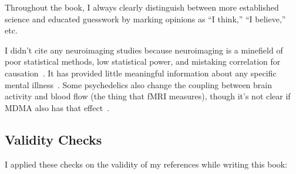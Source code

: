 \documentclass[11pt,oneside]{book}
\let\cite\parencite
\begin{document}
Throughout the book, I always clearly distinguish between more established science and educated guesswork by marking opinions as \enquote{I think,} \enquote{I believe,} etc.

I didn't cite any neuroimaging studies because neuroimaging is a minefield of poor statistical methods, low statistical power, and mistaking correlation for causation~\cite{hoelNeuroscience}. It has provided little meaningful information about any specific mental illness~\cite{etkin2019reckoning}. Some psychedelics also change the coupling between brain activity and blood flow (the thing that fMRI measures), though it's not clear if MDMA also has that effect~\cite{padawerNeurovascularCoupling}.

\subsection*{Validity Checks}
I applied these checks on the validity of my references while writing this book:
\end{document}

